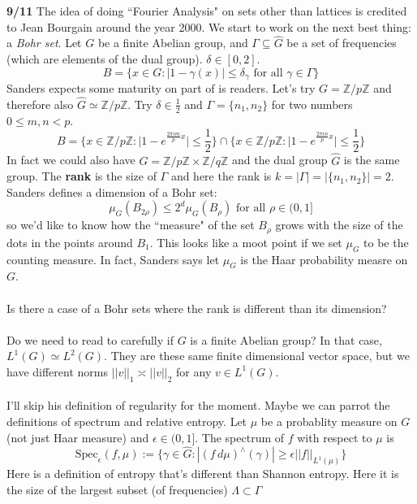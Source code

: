 \documentclass[12pt]{article}
\begin{document}
\noindent \textbf{9/11} The idea of doing ``Fourier Analysis" on sets other than lattices is credited to Jean Bourgain around the year 2000. We start to work on the next best thing: a \textit{Bohr set}.  Let $G$ be a finite Abelian group, and $\Gamma \subseteq \widehat{G}$ be a set of frequencies (which are elements of the dual group).  $\delta \in [0,2]$.
$$ B = \{ x \in G : | 1 - \gamma(x) | \leq \delta_\gamma \text{ for all } \gamma \in \Gamma \}  $$
Sanders expects some maturity on part of is readers.  Let's try $G = \mathbb{Z}/p\mathbb{Z}$ and therefore also $\widehat{G} \simeq \mathbb{Z}/p\mathbb{Z} $.  Try $\delta \in \frac{1}{2}$ and $\Gamma = \{ n_1, n_2 \}$ for two numbers $0 \leq m,n < p$. 
$$ B = \Big\{ x \in \mathbb{Z}/p\mathbb{Z} : \big| 1 - e^{ \frac{2\pi im}{ p} x } \big| \leq  \frac{1}{2}  \Big\} \cap \Big\{ x \in \mathbb{Z}/p\mathbb{Z} : \big| 1 - e^{ \frac{2\pi in}{ p} x } \big| \leq  \frac{1}{2}  \Big\}  $$
In fact we could also have $G = \mathbb{Z}/p\mathbb{Z} \times \mathbb{Z}/q\mathbb{Z}$ and the dual group $\widehat{G}$ is the same group.  The \textbf{rank} is the size of $\Gamma$  and here the rank is $k = |\Gamma| = |\{ n_1, n_2\}| = 2$.  Sanders defines a dimension of a Bohr set:
$$ \mu_G( B_{2\rho}) \leq 2^d \mu_G(B_\rho) \text{ for all } \rho \in (0,1] $$
so we'd like to know how the ``measure" of the set $B_\rho$ grows with the size of the dots in the points around $B_1$.  This looks like a moot point if we set $\mu_G$ to be the counting measure.  In fact, Sanders says let $\mu_G $ is the Haar probability measre on $G$.   \\ \\
Is there a case of a Bohr sets where the rank is different than its dimension? \\ \\
Do we need to read to carefully if $G$ is a finite Abelian group?  In that case, $L^1(G) \simeq L^2(G)$.  They are these same finite dimensional vector space, but we have different norms $||v||_1 \asymp ||v||_2$ for any $v \in L^1(G)$. \\ \\
I'll skip his definition of regularity for the moment.  Maybe we can parrot the definitions of spectrum and relative entropy.    Let $\mu$ be a probablity measure on $G$ (not just Haar measure) and $\epsilon \in (0,1]$.  The spectrum of $f$ with respect to $\mu$ is
$$ \text{Spec}_\epsilon (f, \mu) := \big\{ \gamma \in \widehat{G}: |(f\, d\mu)^\wedge(\gamma)| \geq \epsilon || f||_{L^1(\mu)}  \big\} $$ 
Here is a definition of entropy that's different than Shannon entropy.  Here it is the size of the largest subset (of frequencies) $\Lambda \subset \Gamma$
\end{document}
